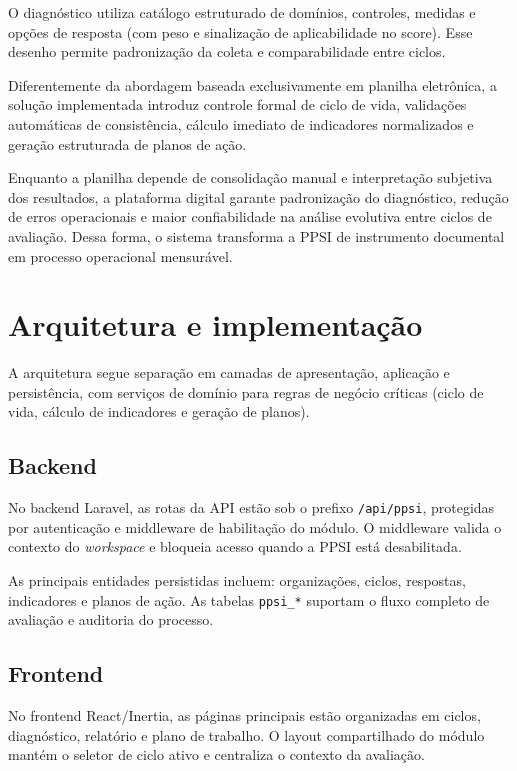 \documentclass[12pt]{article}
\begin{document}
O diagnóstico utiliza catálogo estruturado de domínios, controles, medidas e opções de resposta (com peso e sinalização de aplicabilidade no score). Esse desenho permite padronização da coleta e comparabilidade entre ciclos.

Diferentemente da abordagem baseada exclusivamente em planilha eletrônica, a solução implementada introduz controle formal de ciclo de vida, validações automáticas de consistência, cálculo imediato de indicadores normalizados e geração estruturada de planos de ação.

Enquanto a planilha depende de consolidação manual e interpretação subjetiva dos resultados, a plataforma digital garante padronização do diagnóstico, redução de erros operacionais e maior confiabilidade na análise evolutiva entre ciclos de avaliação. Dessa forma, o sistema transforma a PPSI de instrumento documental em processo operacional mensurável.

\section{Arquitetura e implementação}

A arquitetura segue separação em camadas de apresentação, aplicação e persistência, com serviços de domínio para regras de negócio críticas (ciclo de vida, cálculo de indicadores e geração de planos).

\subsection{Backend}

No backend Laravel, as rotas da API estão sob o prefixo \texttt{/api/ppsi}, protegidas por autenticação e middleware de habilitação do módulo. O middleware valida o contexto do \textit{workspace} e bloqueia acesso quando a PPSI está desabilitada.

As principais entidades persistidas incluem: organizações, ciclos, respostas, indicadores e planos de ação. As tabelas \texttt{ppsi\_*} suportam o fluxo completo de avaliação e auditoria do processo.

\subsection{Frontend}

No frontend React/Inertia, as páginas principais estão organizadas em ciclos, diagnóstico, relatório e plano de trabalho. O layout compartilhado do módulo mantém o seletor de ciclo ativo e centraliza o contexto da avaliação.
\end{document}
